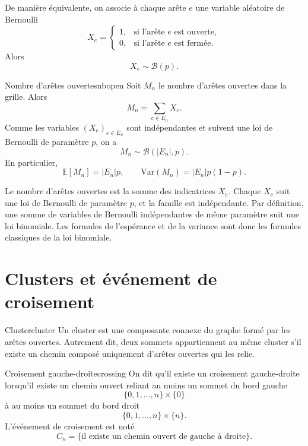 \documentclass[11pt,a4paper]{report}
\newenvironment{proofbox}
{\begin{tcolorbox}[colback=grisclair,colframe=black!25,title=\textbf{Démonstration},fonttitle=\bfseries,sharp corners,boxrule=0.6pt]}
{\end{tcolorbox}}
\newcommand{\E}{\mathbb{E}}
\newcommand{\Var}{\mathrm{Var}}
\begin{document}
De manière équivalente, on associe à chaque arête $e$ une variable aléatoire de Bernoulli
\[
X_e=
\begin{cases}
1, & \text{si l'arête } e \text{ est ouverte},\\
0, & \text{si l'arête } e \text{ est fermée}.
\end{cases}
\]
Alors
\[
X_e\sim\mathcal{B}(p).
\]

\begin{propositionbox}{Nombre d'arêtes ouvertes}{nbopen}
Soit $M_n$ le nombre d'arêtes ouvertes dans la grille. Alors
\[
M_n=\sum_{e\in E_n}X_e.
\]
Comme les variables $(X_e)_{e\in E_n}$ sont indépendantes et suivent une loi de Bernoulli de paramètre $p$, on a
\[
M_n\sim\mathcal{B}(|E_n|,p).
\]
En particulier,
\[
\E[M_n]=|E_n|p,
\qquad
\Var(M_n)=|E_n|p(1-p).
\]
\end{propositionbox}

\begin{proofbox}
Le nombre d'arêtes ouvertes est la somme des indicatrices $X_e$. Chaque $X_e$ suit une loi de Bernoulli de paramètre $p$, et la famille est indépendante. Par définition, une somme de variables de Bernoulli indépendantes de même paramètre suit une loi binomiale. Les formules de l'espérance et de la variance sont donc les formules classiques de la loi binomiale.
\end{proofbox}

\section{Clusters et événement de croisement}

\begin{definitionbox}{Cluster}{cluster}
Un cluster est une composante connexe du graphe formé par les arêtes ouvertes. Autrement dit, deux sommets appartiennent au même cluster s'il existe un chemin composé uniquement d'arêtes ouvertes qui les relie.
\end{definitionbox}

\begin{definitionbox}{Croisement gauche-droite}{crossing}
On dit qu'il existe un croisement gauche-droite lorsqu'il existe un chemin ouvert reliant au moins un sommet du bord gauche
\[
\{0,1,\ldots,n\}\times\{0\}
\]
à au moins un sommet du bord droit
\[
\{0,1,\ldots,n\}\times\{n\}.
\]
L'événement de croisement est noté
\[
C_n=\{\text{il existe un chemin ouvert de gauche à droite}\}.
\]
\end{definitionbox}
\end{document}
